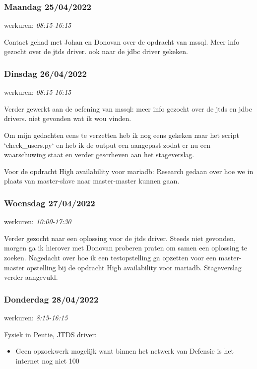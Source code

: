 \subsubsection{Maandag 25/04/2022}

werkuren: \emph{08:15-16:15}

Contact gehad met Johan en Donovan over de opdracht van \gls{mssql}. Meer info gezocht over de jtds driver. ook naar de jdbc driver gekeken.

\subsubsection{Dinsdag 26/04/2022}

werkuren: \emph{08:15-16:15}

Verder gewerkt aan de oefening van \gls{mssql}: meer info gezocht over de jtds en jdbc drivers. niet gevonden wat ik wou vinden.

Om mijn gedachten eens te verzetten heb ik nog eens gekeken naar het script `check\_users.py` en heb ik de output een aangepast zodat er nu een waarschuwing staat en verder gescrheven aan het stageverslag.

Voor de opdracht High availability voor mariadb: Research gedaan over hoe we in plaats van master-slave naar master-master kunnen gaan.


\subsubsection{Woensdag 27/04/2022}

werkuren: \emph{10:00-17:30}

Verder gezocht naar een oplossing voor de jtds driver. Steeds niet gevonden, morgen ga ik hierover met Donovan proberen praten om samen een oplossing te zoeken.
Nagedacht over hoe ik een testopstelling ga opzetten voor een master-master opstelling bij de opdracht High availability voor mariadb.
Stageverslag verder aangevuld.

\subsubsection{Donderdag 28/04/2022}

werkuren: \emph{8:15-16:15}

Fysiek in Peutie, JTDS driver:

\begin{itemize}
    \item Geen opzoekwerk mogelijk want binnen het netwerk van Defensie is het internet nog niet 100%
\end{itemize}

